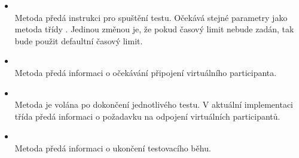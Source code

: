 \begin{itemize}
    \item {} \\ Metoda předá instrukci pro spuštění testu. Očekává stejné parametry jako metoda  třídy . Jedinou změnou je, že pokud časový limit nebude zadán, tak bude použit defaultní časový limit.
    \item {} \\ Metoda předá informaci o očekávání připojení virtuálního participanta.
    \item {} \\ Metoda je volána po dokončení jednotlivého testu. V aktuální implementaci třída předá informaci o požadavku na odpojení virtuálních participantů.
    \item {} \\ Metoda předá informaci o ukončení testovacího běhu.
\end{itemize}

